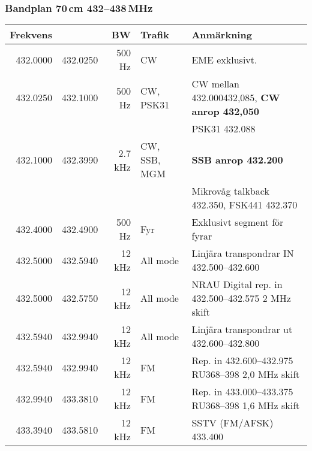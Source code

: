 \subsubsection{Bandplan 70\,cm 432--438\,MHz}
\begin{tabular}{rrrll}
	\textbf{Frekvens} &          & \textbf{BW} & \textbf{Trafik} & \textbf{Anmärkning}                                         \\ \hline
	
	
	         432.0000 & 432.0250 &      500 Hz & CW              & EME exklusivt.                                              \\ \hline
	         432.0250 & 432.1000 &      500 Hz & CW, PSK31       & CW mellan \num{432,000}{432,085}, \textbf{CW anrop 432,050} \\
	                  &          &             &                 & PSK31 \num{432,088}                                               \\ \hline
	         432.1000 & 432.3990 &     2.7 kHz & CW, SSB, MGM    & \textbf{SSB anrop \num{432,200}}                                  \\
	                  &          &             &                 & Mikrovåg talkback \num{432,350}, FSK441 \num{432,370}                   \\ \hline
	         432.4000 & 432.4900 &      500 Hz & Fyr             & Exklusivt segment för fyrar                                 \\ \hline
	         432.5000 & 432.5940 &      12 kHz & All mode        & Linjära transpondrar IN \numrange{432,500}{432,600}                        \\ \hline
	         432.5000 & 432.5750 &      12 kHz & All mode        & NRAU Digital rep. in \numrange{432,500}{432,575} 2 MHz skift               \\ \hline
	         432.5940 & 432.9940 &      12 kHz & All mode        & Linjära transpondrar ut \numrange{432,600}{432,800}                        \\ \hline
	         432.5940 & 432.9940 &      12 kHz & FM              & Rep. in \numrange{432,600}{432,975} RU368--398 2,0 MHz skift                 \\ \hline
	         432.9940 & 433.3810 &      12 kHz & FM              & Rep. in \numrange{433,000}{433,375} RU368--398 1,6 MHz skift               \\ \hline
	         433.3940 & 433.5810 &      12 kHz & FM              & SSTV (FM/AFSK) \num{433,400}                                      \\

\end{tabular}
